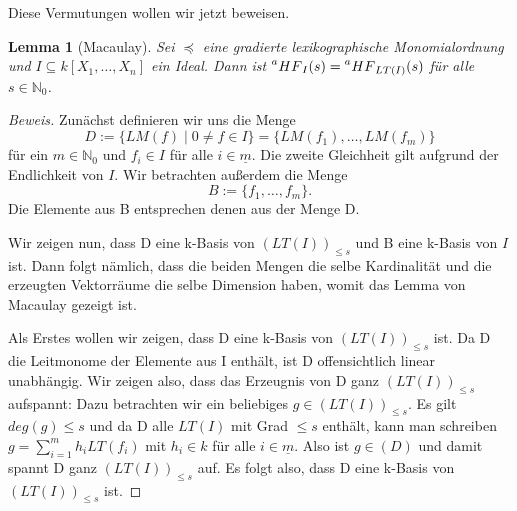 \documentclass{article}
\newtheorem{lemma}[satz]{Lemma}
\newcommand*{\R}{k[X_{1},\ldots,X_{n}]}
\begin{document}
	Diese Vermutungen wollen wir jetzt beweisen.

	\begin{lemma}[Macaulay] \label{1.2.13}
	Sei \(\preceq\) eine gradierte lexikographische Monomialordnung und \(I \subseteq \R\) ein
	Ideal. Dann ist \(\prescript{a}{}{HF}_{I}(s) = \prescript{a}{}{HF}_{LT(I)}(s)\) für alle
	\(s \in \mathbb{N}_{0}\).
	\end{lemma}

	
	\begin{proof}[Beweis]
	Zunächst definieren wir uns die Menge
	\begin{displaymath}
		D := \{ LM(f) \; | \; 0 \neq f \in I \} = \{LM(f_1), \ldots, LM(f_m)\}
	\end{displaymath}
	für ein \(m \in \mathbb{N}_{0}\) und \(f_{i} \in I\) für alle \(i \in \underline{m}\). Die
	zweite Gleichheit gilt aufgrund der Endlichkeit von \(I\).
	Wir betrachten außerdem die Menge
	\begin{displaymath} B := \{f_{1}, \ldots, f_{m}\}. \end{displaymath}
	Die Elemente aus B entsprechen denen aus der Menge D.

	Wir zeigen nun, dass D eine k-Basis von \((LT(I))_{\leq s}\) und B eine k-Basis von \(I\) ist.
	Dann folgt nämlich, dass die beiden Mengen die selbe Kardinalität und die erzeugten
	Vektorräume die selbe Dimension haben, womit das Lemma von Macaulay gezeigt ist.

	Als Erstes wollen wir zeigen, dass D eine k-Basis von \((LT(I))_{\leq s}\) ist. Da D die
	Leitmonome der Elemente aus I enthält, ist D offensichtlich linear unabhängig.
	Wir zeigen also, dass das Erzeugnis von D ganz \((LT(I))_{\leq s}\) aufspannt: Dazu
	betrachten wir ein beliebiges \(g \in (LT(I))_{\leq s}\). Es gilt \(deg(g) \leq s\) und da D
	alle \(LT(I)\) mit Grad \(\leq s\) enthält, kann man schreiben 
	\(g = \sum_{i=1}^{m} h_{i}LT(f_{i})\) mit \(h_{i} \in k\) für alle \(i \in \underline{m}\).
	Also ist \(g \in (D)\) und damit spannt D ganz \((LT(I))_{\leq s}\) auf. Es folgt also, dass
	D eine k-Basis von \((LT(I))_{\leq s}\) ist.
	

\end{proof}
\end{document}
